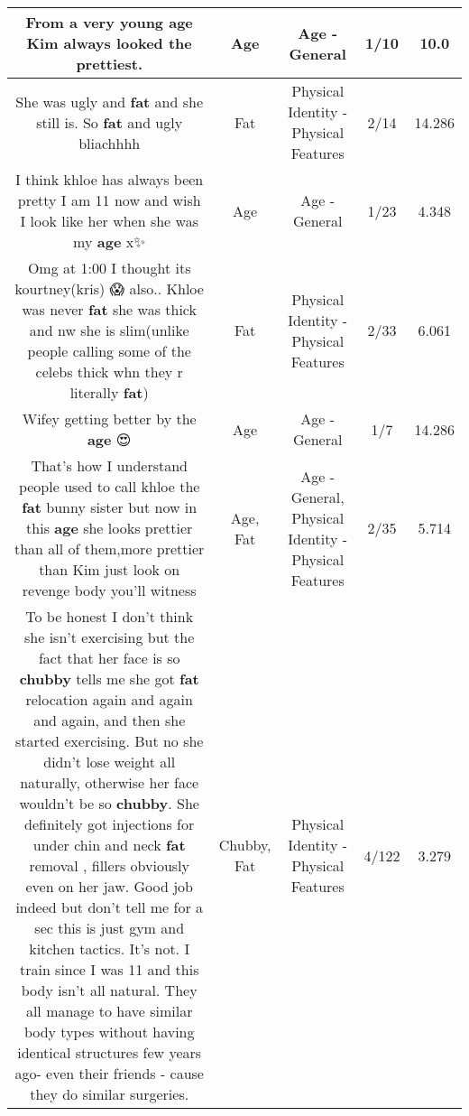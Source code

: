 \documentclass[11pt]{article}
\newlength\mylength
\begin{document}
\begin{center}
\begin{longtable}{|C{.65\mylength}|C{.30\mylength}|C{.12\mylength}|C{.12\mylength}|C{.12\mylength}|}
  \small From a very young \textbf{age} Kim always looked the prettiest.\normalsize   & Age & Age - General & 1/10 & 10.0 \\  \hline
  \small She was ugly and \textbf{fat} and she still is. So \textbf{fat} and ugly bliachhhh\normalsize   & Fat & Physical Identity - Physical Features & 2/14 & 14.286 \\  \hline
  \small I think khloe has always been pretty I am 11 now and wish I look like her when she was my \textbf{age} x✨\normalsize   & Age & Age - General & 1/23 & 4.348 \\  \hline
  \small Omg at 1:00 I thought its kourtney(kris) 😱 also.. Khloe was never \textbf{fat} she was thick and nw she is slim(unlike people calling some of the celebs thick whn they r literally \textbf{fat})\normalsize   & Fat & Physical Identity - Physical Features & 2/33 & 6.061 \\  \hline
  \small Wifey getting better by the \textbf{age} 😍\normalsize   & Age & Age - General & 1/7 & 14.286 \\  \hline
  \small That's how I understand people used to call khloe the \textbf{fat} bunny sister but now in this \textbf{age} she looks prettier than all of them,more prettier than Kim just look on revenge body you'll witness\normalsize   & Age, Fat & Age - General, Physical Identity - Physical Features & 2/35 & 5.714 \\  \hline
  \small To be honest I don't think she isn't exercising but the fact that her face is so \textbf{chubby} tells me she got \textbf{fat} relocation again and again and again, and then she started exercising. But no she didn't lose weight all naturally, otherwise her face wouldn't be so \textbf{chubby}. She definitely got injections for under chin and neck \textbf{fat} removal , fillers obviously even on her jaw. Good job indeed but don't tell me for a sec this is just gym and kitchen tactics. It's not. I train since I was 11 and this body isn't all natural. They all manage to have similar body types without having identical structures few years ago- even their friends - cause they do similar surgeries.\normalsize   & Chubby, Fat & Physical Identity - Physical Features & 4/122 & 3.279 \\  \hline

\end{longtable}
\end{center}
\end{document}
